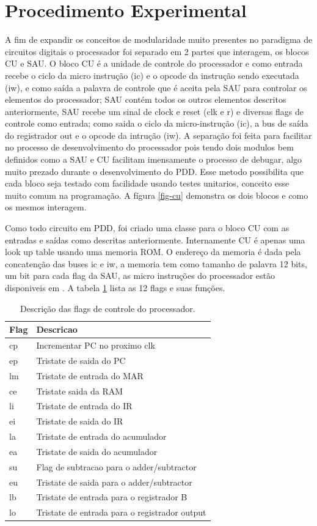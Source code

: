 \documentclass[11pt, twocolumn]{article}
\begin{document}
\section{Procedimento Experimental}
  
A fim de expandir os conceitos de modularidade muito presentes no paradigma de circuitos digitais o processador foi separado em 2 partes que interagem, os blocos CU e SAU. O bloco CU é a unidade de controle do processador e como entrada recebe o ciclo da micro instrução (ic) e o opcode da instrução sendo executada (iw), e como saída a palavra de controle que é aceita pela SAU para controlar os elementos do processador; SAU contém todos os outros elementos descritos anteriormente, SAU recebe um sinal de clock e reset (clk e r) e diversas flags de controle como entrada; como saida o ciclo da micro-instrução (ic), a bus de saída do registrador out e o opcode da intrução (iw). A separação foi feita para facilitar no processo de desenvolvimento do processador pois tendo dois modulos bem definidos como a SAU e CU facilitam imensamente o processo de debugar, algo muito prezado durante o desenvolvimento do PDD. Esse metodo possibilita que cada bloco seja testado com facilidade usando testes unitarios, conceito esse muito comum na programação. A fígura \ref{fig-cu} demonstra os dois blocos e como os mesmos interagem.

Como todo circuito em PDD, foi criado uma classe para o bloco CU com as entradas e saídas como descritas anteriormente. Internamente CU é apenas uma look up table usando uma memoria ROM. O endereço da memoria é dada pela concatenção das buses ic e iw, a memoria tem como tamanho de palavra 12 bits, um bit para cada flag da SAU, as micro instruções do processador estão disponiveis em \cite{malv}. A tabela \ref{tab-flags} lista as 12 flags e suas funções. 

\begin{table}
  \caption{Descrição das flags de controle do processador.}
\begin{tabular}{ll}
\hline
Flag & Descricao \\
\hline
cp & Incrementar PC no proximo clk \\
ep & Tristate de saida do PC \\
lm & Tristate de entrada do MAR \\
ce & Tristate saida da RAM \\
li & Tristate de entrada do IR \\
ei & Tristate de saida do IR \\
la & Tristate de entrada do acumulador \\
ea & Tristate de saida do acumulador \\
su & Flag de subtracao para o adder/subtractor \\
eu & Tristate de saida para o adder/subtractor \\
lb & Tristate de entrada para o registrador B \\
lo & Tristate de entrada para o registrador output \\
\hline
\end{tabular}
\label{tab-flags}
\end{table}
\end{document}
